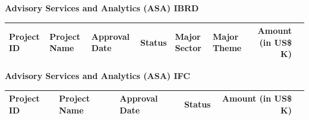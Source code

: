 \documentclass{article}\usepackage[]{graphicx}\usepackage[]{color}
\begin{document}
\begin{minipage}[b]{0.99\textwidth}
\begin{minipage}[b]{0.99\textwidth}
\begin{minipage}[c]{0.99\textwidth}
     \vspace*{0.5cm}
     \end{minipage}
     
     \begin{minipage}[c]{0.99\textwidth} %
     \raggedright{\color{white!30!blue} \textbf{\large Advisory Services and Analytics (ASA) IBRD}}
     \vspace*{0.5cm}
     
{\small
\begin{tabular}{l>{\raggedright}p{1in}ll>{\raggedright}p{1in}>{\raggedright}p{1in}rl}
 Project ID & Project Name & Approval Date & Status & Major Sector & Major Theme & Amount (in US\$ K) &  \\ 
  \hline
\end{tabular}
}

     \vspace*{0.5cm}
     \end{minipage}
     
     \begin{minipage}[c]{0.99\textwidth} %
     \raggedright{\color{white!30!blue} \textbf{\large Advisory Services and Analytics (ASA) IFC}}
     \vspace*{0.5cm}
     
{\small
\begin{tabular}{l>{\raggedright}p{2.5in}llrl}
 Project ID & Project Name & Approval Date & Status & Amount (in US\$ K) &  \\ 
  \hline
\end{tabular}
}

     \vspace*{0.5cm}
     \end{minipage}
     
    \end{minipage}
\end{minipage}
 
\end{document}
